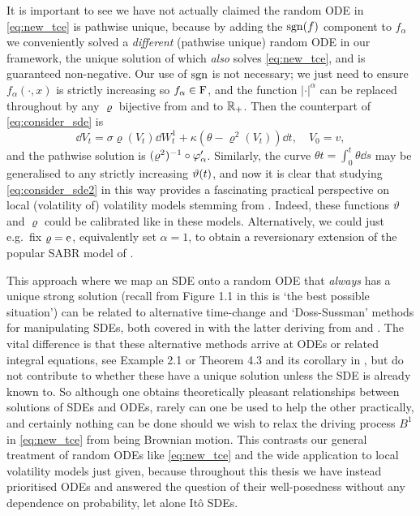 It is important to see we have not actually claimed the random ODE in \autoref{eq:new_tce} is pathwise unique, because by adding the $\mathrm{sgn}(f)$ component to $f_\alpha$ we conveniently solved a \emph{different} (pathwise unique) random ODE in our framework, the unique solution of which \emph{also} solves \autoref{eq:new_tce}, and is guaranteed non-negative. Our use of $\mathrm{sgn}$ is not necessary; we just need to ensure $f_\alpha(\cdot,x)$ is strictly increasing so $f_\alpha\in\mathrm{F}$, and the function $|\cdot|^\alpha$ can be replaced throughout by any $\varrho$ bijective from and to $\mathbb{R}_+$. Then the counterpart of \autoref{eq:consider_sde} is
\begin{equation}\label{eq:consider_sde2}
    \dd V_t = \sigma \varrho(V_t)\dd W^1_t + \kappa(\theta - \varrho^2(V_t))\dd t,\quad V_0=v,
\end{equation}
and the pathwise solution is $(\varrho^2)^{-1}\circ \varphi'_\alpha$. Similarly, the curve $\theta t = \int_0^t \theta \dd s$ may be generalised to any strictly increasing $\vartheta(t)$, and now it is clear that studying \autoref{eq:consider_sde2} in this way provides a fascinating practical perspective on local (volatility of) volatility models stemming from \cite{dupire_1994}. Indeed, these functions $\vartheta$ and $\varrho$ could be calibrated like in these models. Alternatively, we could just e.g.~fix $\varrho=\mathrm{e}$, equivalently set $\alpha=1$, to obtain a reversionary extension of the popular SABR model of \cite{hagan_2002}.

\vspace{2mm}This approach where we map an SDE onto a random ODE that \emph{always} has a unique strong solution (recall from Figure 1.1 in \cite{cherny_2005} this is `the best possible situation') can be related to alternative time-change and `Doss-Sussman' methods for manipulating SDEs, both covered in \cite{ikeda_1989} with the latter deriving from \cite{doss_1977} and \cite{sussmann_1978}. The vital difference is that these alternative methods arrive at ODEs or related integral equations, see Example 2.1 or Theorem 4.3 and its corollary in \cite{ikeda_1989}, but do not contribute to whether these have a unique solution unless the SDE is already known to. So although one obtains theoretically pleasant relationships between solutions of SDEs and ODEs, rarely can one be used to help the other practically, and certainly nothing can be done should we wish to relax the driving process $B^1$ in \autoref{eq:new_tce} from being Brownian motion. This contrasts our general treatment of random ODEs like \autoref{eq:new_tce} and the wide application to local volatility models just given, because throughout this thesis we have instead prioritised ODEs and answered the question of their well-posedness without any dependence on probability, let alone It\^o SDEs.

